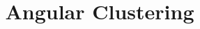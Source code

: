 \documentclass[prd,amsmath,amssymb,floatfix,superscriptaddress,nofootinbib]{revtex4-1}
\begin{document}
\title{Angular Clustering}
%
\end{document}
